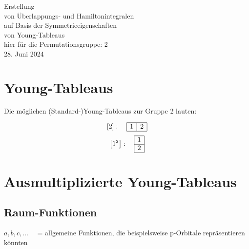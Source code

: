 \documentclass[fleqn]{article}%
\begin{document}
%
\normalsize%
\noindent%
\thispagestyle{empty}%
\begin{center}%
\vspace*{4cm}%
\Huge{}%
Erstellung %
\\ %
 von Überlappungs{-} und Hamiltonintegralen %
\\ %
 auf Basis der Symmetrieeigenschaften %
\\ %
 von Young{-}Tableaus%
\\ %
\vspace{1cm}%
\Large{hier für die Permutationsgruppe: 2}%
\\ %
\vspace{4cm}%
\Large{28. Juni 2024}%
\end{center}%
\newpage%
\setcounter{page}{1}%
\pagestyle{fancy}%
\fancyhf{}%
%
\fancyhead[R]{\nouppercase{\leftmark}}%
\renewcommand{\footrulewidth}{0.4pt}%
\fancyfoot[C]{\thepage}%
\section{Young{-}Tableaus}%
\label{sec:Young{-}Tableaus}%
Die möglichen (Standard-)Young-Tableaus zur Gruppe 2 lauten:

%
\vspace{0.25cm}%
\begin{dmath*}\left[2\right]:\quad\begin{array}{|c|c|} \hline 1 & 2\\ \cline{1-2} \end{array} \end{dmath*}%
\vspace{0.25cm}%
\begin{dmath*}\left[1^2\right]:\quad\begin{array}{|c|} \hline 1\\ \cline{1-1} 2\\ \cline{1-1} \end{array} \end{dmath*}%
\vspace{0.25cm}%
\newpage%
\section{Ausmultiplizierte Young{-}Tableaus}%
\label{sec:AusmultiplizierteYoung{-}Tableaus}%

%
\subsection{Raum{-}Funktionen}%
\label{subsec:Raum{-}Funktionen}%
$a, b, c, \hdots \quad $ = allgemeine Funktionen, die beispielsweise p-Orbitale repräsentieren könnten
\end{document}
